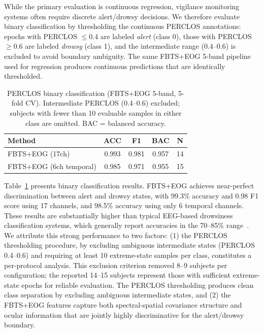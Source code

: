 \documentclass{iopjournal}
\begin{document}
While the primary evaluation is continuous regression, vigilance monitoring systems often require discrete alert/drowsy decisions. We therefore evaluate binary classification by thresholding the continuous PERCLOS annotations: epochs with PERCLOS $\leq 0.4$ are labeled \emph{alert} (class 0), those with PERCLOS $\geq 0.6$ are labeled \emph{drowsy} (class 1), and the intermediate range ($0.4$--$0.6$) is excluded to avoid boundary ambiguity. The same FBTS+EOG 5-band pipeline used for regression produces continuous predictions that are identically thresholded.

\begin{table}
\caption{PERCLOS binary classification (FBTS+EOG 5-band, 5-fold CV). Intermediate PERCLOS (0.4--0.6) excluded; subjects with fewer than 10 evaluable samples in either class are omitted. BAC = balanced accuracy.}
\centering
\begin{tabular}{lcccc}
\toprule
\textbf{Method} & \textbf{ACC} & \textbf{F1} & \textbf{BAC} & \textbf{N} \\
\midrule
FBTS+EOG (17ch) & 0.993 & 0.981 & 0.957 & 14 \\
FBTS+EOG (6ch temporal) & 0.985 & 0.971 & 0.955 & 15 \\
\bottomrule
\end{tabular}
\label{tab:binary}
\end{table}

Table~\ref{tab:binary} presents binary classification results. FBTS+EOG achieves near-perfect discrimination between alert and drowsy states, with 99.3\% accuracy and 0.98 F1 score using 17 channels, and 98.5\% accuracy using only 6 temporal channels. These results are substantially higher than typical EEG-based drowsiness classification systems, which generally report accuracies in the 70--85\% range~\cite{kartsch2018sleep}. We attribute this strong performance to two factors: (1) the PERCLOS thresholding procedure, by excluding ambiguous intermediate states (PERCLOS 0.4--0.6) and requiring at least 10 extreme-state samples per class, constitutes a per-protocol analysis. This exclusion criterion removed 8--9 subjects per configuration; the reported 14--15 subjects represent those with sufficient extreme-state epochs for reliable evaluation. The PERCLOS thresholding produces clean class separation by excluding ambiguous intermediate states, and (2) the FBTS+EOG features capture both spectral-spatial covariance structure and ocular information that are jointly highly discriminative for the alert/drowsy boundary.
\end{document}
